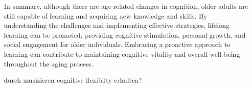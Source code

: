






In summary, although there are age-related changes in cognition, older adults are still capable of learning and acquiring new knowledge and skills. By understanding the challenges and implementing effective strategies, lifelong learning can be promoted, providing cognitive stimulation, personal growth, and social engagement for older individuals. Embracing a proactive approach to learning can contribute to maintaining cognitive vitality and overall well-being throughout the aging process.




durch musizieren cognitive flexibilty erhalten?

